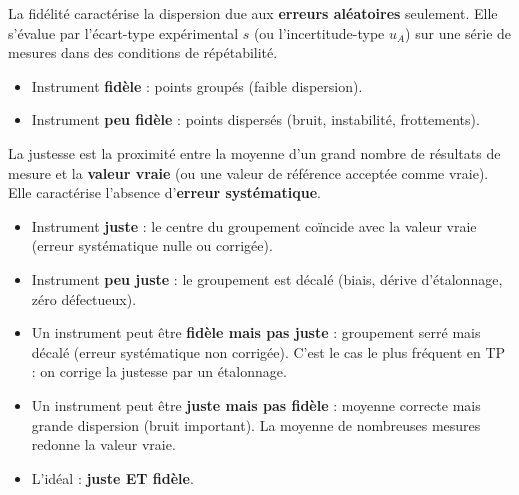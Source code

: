 \documentclass[11pt]{article}
\newcommand{\cle}[1]{{\popxbold\color{popdark}#1}}
\newcounter{popsec}
\newcounter{popsub}
\newcommand{\courssub}[1]{%
  \stepcounter{popsub}%
  \par\vspace{9pt}\noindent{\popxbold\fontsize{11.5}{13}\selectfont\color{popink}{\color{poporange}\thepopsec.\thepopsub}\hspace{6pt}#1}\par\nopagebreak\vspace{4pt}
}
\begin{document}
\begin{propriete}
La fidélité caractérise la dispersion due aux \textbf{erreurs aléatoires} seulement. Elle s'évalue par l'écart-type expérimental $s$ (ou l'incertitude-type $u_A$) sur une série de mesures dans des conditions de répétabilité.
\begin{itemize}
\item Instrument \textbf{fidèle} : points groupés (faible dispersion).
\item Instrument \textbf{peu fidèle} : points dispersés (bruit, instabilité, frottements).
\end{itemize}
\end{propriete}

\courssub{Justesse (ou exactitude)}

\begin{definition}[Justesse]
La \cle{justesse} est la proximité entre la moyenne d'un grand nombre de résultats de mesure et la \textbf{valeur vraie} (ou une valeur de référence acceptée comme vraie). Elle caractérise l'absence d'\textbf{erreur systématique}.
\end{definition}

\begin{propriete}
\begin{itemize}
\item Instrument \textbf{juste} : le centre du groupement coïncide avec la valeur vraie (erreur systématique nulle ou corrigée).
\item Instrument \textbf{peu juste} : le groupement est décalé (biais, dérive d'étalonnage, zéro défectueux).
\end{itemize}
\end{propriete}

\begin{attention}
\begin{itemize}
\item Un instrument peut être \textbf{fidèle mais pas juste} : groupement serré mais décalé (erreur systématique non corrigée). C'est le cas le plus fréquent en TP : on corrige la justesse par un étalonnage.
\item Un instrument peut être \textbf{juste mais pas fidèle} : moyenne correcte mais grande dispersion (bruit important). La moyenne de nombreuses mesures redonne la valeur vraie.
\item L'idéal : \textbf{juste ET fidèle}.
\end{itemize}
\end{attention}
\end{document}
